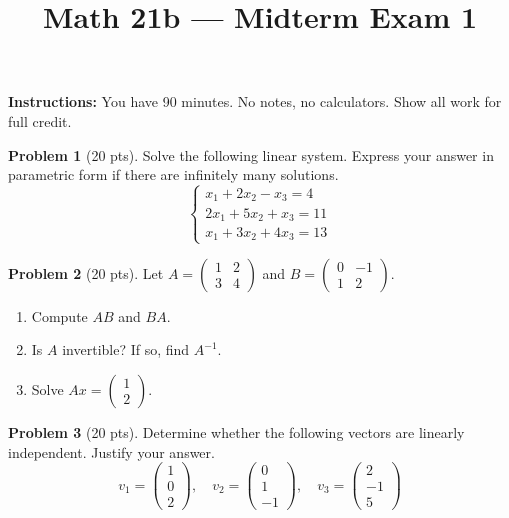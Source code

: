 \documentclass{amsart}
\title{Math 21b --- Midterm Exam 1}
\date{}
\begin{document}
\maketitle
\textbf{Instructions:} You have 90 minutes. No notes, no calculators. Show all work for full credit.

\bigskip

\textbf{Problem 1} (20 pts). Solve the following linear system. Express your answer in parametric form if there are infinitely many solutions.
\[
\begin{cases}
x_1 + 2x_2 - x_3 = 4 \\
2x_1 + 5x_2 + x_3 = 11 \\
x_1 + 3x_2 + 4x_3 = 13
\end{cases}
\]

\bigskip

\textbf{Problem 2} (20 pts). Let $A = \begin{pmatrix} 1 & 2 \\ 3 & 4 \end{pmatrix}$ and $B = \begin{pmatrix} 0 & -1 \\ 1 & 2 \end{pmatrix}$.
\begin{enumerate}
    \item[(a)] Compute $AB$ and $BA$.
    \item[(b)] Is $A$ invertible? If so, find $A^{-1}$.
    \item[(c)] Solve $Ax = \begin{pmatrix}1\\2\end{pmatrix}$.
\end{enumerate}

\bigskip

\textbf{Problem 3} (20 pts). Determine whether the following vectors are linearly independent. Justify your answer.
\[
v_1 = \begin{pmatrix}1\\0\\2\end{pmatrix},\quad v_2 = \begin{pmatrix}0\\1\\-1\end{pmatrix},\quad v_3 = \begin{pmatrix}2\\-1\\5\end{pmatrix}
\]
\end{document}
